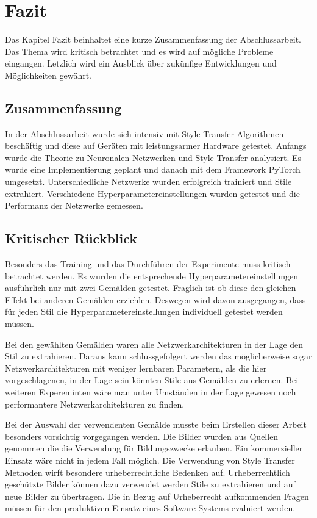\chapter{Fazit}

Das Kapitel Fazit beinhaltet eine kurze Zusammenfassung der Abschlussarbeit. Das Thema wird kritisch betrachtet und es wird auf mögliche Probleme eingangen. Letzlich wird ein Ausblick über zukünfige Entwicklungen und Möglichkeiten gewährt.

\section{Zusammenfassung}

In der Abschlussarbeit wurde sich intensiv mit Style Transfer Algorithmen beschäftig und diese auf Geräten mit leistungsarmer Hardware getestet. Anfangs wurde die Theorie zu Neuronalen Netzwerken und Style Transfer analysiert. Es wurde eine Implementierung geplant und danach mit dem Framework PyTorch umgesetzt. Unterschiedliche Netzwerke wurden erfolgreich trainiert und Stile extrahiert. Verschiedene Hyperparametereinstellungen wurden getestet und die Performanz der Netzwerke gemessen.


\section{Kritischer Rückblick}

Besonders das Training und das Durchführen der Experimente muss kritisch betrachtet werden. Es wurden die entsprechende Hyperparametereinstellungen ausführlich nur mit zwei Gemälden getestet. Fraglich ist ob diese den gleichen Effekt bei anderen Gemälden erziehlen. Deswegen wird davon ausgegangen, dass für jeden Stil die Hyperparametereinstellungen individuell getestet werden müssen.

Bei den gewählten Gemälden waren alle Netzwerkarchitekturen in der Lage den Stil zu extrahieren. Daraus kann schlussgefolgert werden das möglicherweise sogar Netzwerkarchitekturen mit weniger lernbaren Parametern, als die hier vorgeschlagenen, in der Lage sein könnten Stile aus Gemälden zu erlernen. Bei weiteren Expereminten wäre man unter Umständen in der Lage gewesen noch performantere Netzwerkarchitekturen zu finden.

Bei der Auswahl der verwendenten Gemälde musste beim Erstellen dieser Arbeit besonders vorsichtig vorgegangen werden. Die Bilder wurden aus Quellen genommen die die Verwendung für Bildungszwecke erlauben. Ein kommerzieller Einsatz wäre nicht in jedem Fall möglich. Die Verwendung von Style Transfer Methoden wirft besondere urheberrechtliche Bedenken auf. Urheberrechtlich geschützte Bilder können dazu verwendet werden Stile zu extrahieren und auf neue Bilder zu übertragen. Die in Bezug auf Urheberrecht aufkommenden Fragen müssen für den produktiven Einsatz eines Software-Systems evaluiert werden.

